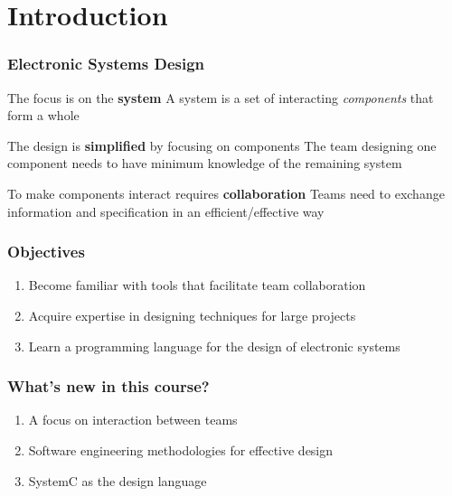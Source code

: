 \section{Introduction}

\begin{frame}
\frametitle{Electronic Systems Design}
\begin{block}{The focus is on the {\bfseries system}}
A system is a set of interacting {\em components} that form a whole
\end{block}
\pause
\begin{exampleblock}{The design is {\bfseries simplified} by focusing on components}
The team designing one component needs to have minimum knowledge of the remaining system
\end{exampleblock}
\pause
\begin{alertblock}{To make components interact requires {\bfseries collaboration}}
Teams need to exchange information and specification in an efficient/effective way
\end{alertblock}
\end{frame}

\begin{frame}
\frametitle{Objectives}
\begin{enumerate}
\item Become familiar with tools that facilitate team collaboration
\item Acquire expertise in designing techniques for large projects
\item Learn a programming language for the design of electronic systems
\end{enumerate}
\end{frame}

\begin{frame}
\frametitle{What's new in this course?}
\begin{enumerate}
\item A focus on interaction between teams
\item Software engineering methodologies for effective design
\item SystemC as the design language
\end{enumerate}
\end{frame}

